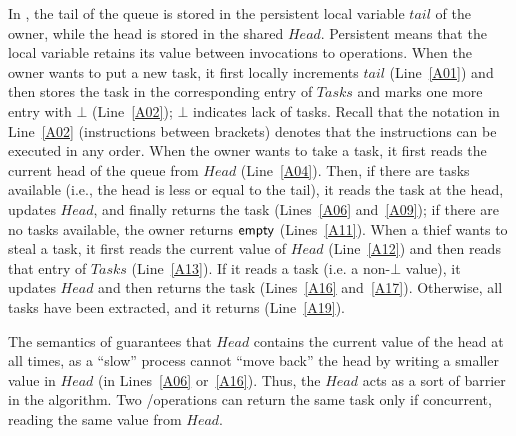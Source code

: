 In \WFWSM, the tail of the queue is stored in the persistent local variable \(tail\) of the owner, while the head is stored in the shared \MaxReg \(Head\). Persistent means that the local variable retains its value between invocations to operations. When the owner wants to put a new task, it first locally increments \(tail\) (Line~\ref{A01}) and then stores the task in the corresponding entry of \(Tasks\) and marks one more entry with \(\bot\) (Line~\ref{A02}); \(\bot\) indicates lack of tasks. Recall that the notation in Line~\ref{A02} (instructions between brackets) denotes that the instructions can be executed in any order. When the owner wants to take a task, it first reads the current head of the queue from \(Head\) (Line~\ref{A04}). Then, if there are tasks available (i.e., the head is less or equal to the tail), it reads the task at the head, updates \(Head\), and finally returns the task (Lines~\ref{A06} and~\ref{A09}); if there are no tasks available, the owner returns ${\sf empty}$ (Lines~\ref{A11}). When a thief wants to steal a task, it first reads the current value of \(Head\) (Line~\ref{A12}) and then reads that entry of \(Tasks\) (Line~\ref{A13}). If it reads a task (i.e. a non-\(\bot\) value), it updates \(Head\) and then returns the task (Lines~\ref{A16} and~\ref{A17}).  Otherwise, all tasks have been extracted, and it returns \epty (Line~\ref{A19}).

The semantics of \MaxW guarantees that $Head$ contains the current value of the head at all times, as a ``slow'' process cannot ``move back'' the head by writing a smaller value in \(Head\) (in Lines~\ref{A06} or~\ref{A16}). Thus, the \MaxReg \(Head\) acts as a sort of barrier in the algorithm. Two \Take/\Steal operations can return the same task only if concurrent, reading the same value from \(Head\).

